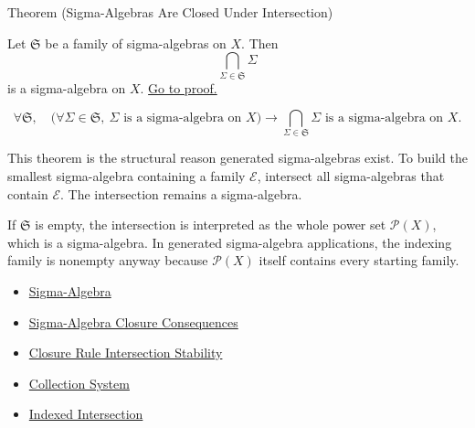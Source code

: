 \begin{theorembox}{Theorem (Sigma-Algebras Are Closed Under Intersection)}
\begin{theorem}\label{thm:sigma-algebras-closed-under-intersection}
Let \(\mathfrak S\) be a family of sigma-algebras on \(X\).  Then
\[
  \bigcap_{\Sigma\in\mathfrak S}\Sigma
\]
is a sigma-algebra on \(X\).
\hyperref[prf:sigma-algebras-closed-under-intersection]{Go to proof.}
\end{theorem}
\end{theorembox}

\begin{remark*}
\[
\forall\mathfrak S,\quad
\bigl(\forall\Sigma\in\mathfrak S,\ \Sigma\text{ is a sigma-algebra on }X\bigr)
\to
\bigcap_{\Sigma\in\mathfrak S}\Sigma\text{ is a sigma-algebra on }X.
\]
\end{remark*}

\begin{remark*}[Interpretation]
This theorem is the structural reason generated sigma-algebras exist.  To build
the smallest sigma-algebra containing a family \(\mathcal E\), intersect all
sigma-algebras that contain \(\mathcal E\).  The intersection remains a
sigma-algebra.
\end{remark*}

\begin{remark*}[Exposition]
If \(\mathfrak S\) is empty, the intersection is interpreted as the whole
power set \(\mathcal P(X)\), which is a sigma-algebra.  In generated
sigma-algebra applications, the indexing family is nonempty anyway because
\(\mathcal P(X)\) itself contains every starting family.
\end{remark*}


\begin{dependencies}
\begin{itemize}
  \item \hyperref[def:sigma-algebra]{Sigma-Algebra}
  \item \hyperref[thm:sigma-algebra-closure-consequences]{Sigma-Algebra Closure Consequences}
  \item \hyperref[thm:closure-rule-intersection-stability]{Closure Rule Intersection Stability}
  \item \hyperref[def:collection-system]{Collection System}
  \item \hyperref[def:indexed-intersection]{Indexed Intersection}
\end{itemize}
\end{dependencies}

